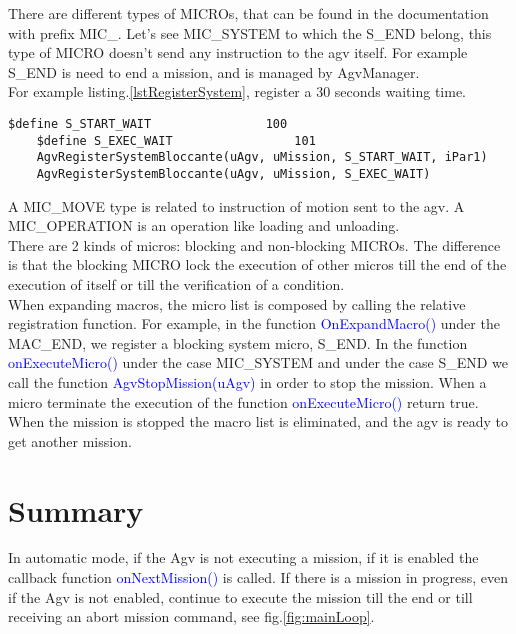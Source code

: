 There are different types of MICROs, that can be found in the documentation with prefix MIC\_. Let's see MIC\_SYSTEM to which the S\_END belong, this type of MICRO doesn't send any instruction to the agv itself. For example S\_END is need to end a mission, and is managed by AgvManager.\\

For example listing.\ref{lstRegisterSystem}, register a 30 seconds waiting time.

\begin{lstlisting}[caption=Wait time system micro ,label=lstRegisterSystem]
	$define S_START_WAIT				100
	$define S_EXEC_WAIT					101
	AgvRegisterSystemBloccante(uAgv, uMission, S_START_WAIT, iPar1)
	AgvRegisterSystemBloccante(uAgv, uMission, S_EXEC_WAIT)
\end{lstlisting}
	

A MIC\_MOVE type is related to instruction of motion sent to the agv. A MIC\_OPERATION is an operation like loading and unloading. \\

There are 2 kinds of micros: blocking and non-blocking MICROs. The difference is that the blocking MICRO lock the execution of other micros till the end of the execution of itself or till the verification of a condition. \\

When expanding macros, the micro list is composed by calling the relative registration function.
For example, in the function \textcolor{blue}{OnExpandMacro()} under the MAC\_END, we register a blocking system micro, S\_END.
In the function \textcolor{blue}{onExecuteMicro()} under the case MIC\_SYSTEM and under the case S\_END we call the function \textcolor{blue}{AgvStopMission(uAgv)} in order to stop the mission. When a micro terminate the execution of the function \textcolor{blue}{onExecuteMicro()} return true. \\

When the mission is stopped the macro list is eliminated, and the agv is ready to get another mission. 



\section{Summary}
In automatic mode, if the Agv is not executing a mission, if it is enabled the callback function \textcolor{blue}{onNextMission()} is called. If there is a mission in progress, even if the Agv is not enabled, continue to execute the mission till the end or till receiving an abort mission command, see fig.\ref{fig:mainLoop}.

